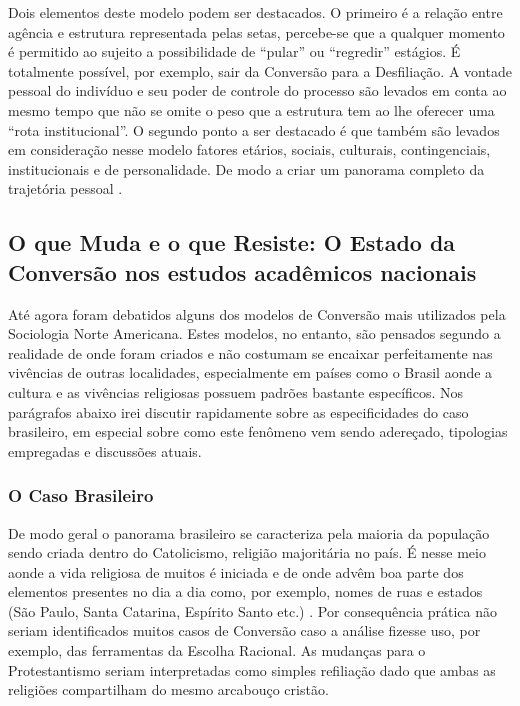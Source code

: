 \documentclass[
	12pt,				%
	oneside,			%
	a4paper,			%
	sumario=tradicional,
	english,			%
	brazil				%
	]{abntex2}
\begin{document}
Dois elementos deste modelo podem ser destacados. O primeiro é a relação entre agência e estrutura representada pelas setas, percebe-se que a qualquer momento é permitido ao sujeito a possibilidade de ``pular'' ou ``regredir'' estágios. É totalmente possível, por exemplo, sair da Conversão para a Desfiliação. A vontade pessoal do indivíduo e seu poder de controle do processo são levados em conta ao mesmo tempo que não se omite o peso que a estrutura tem ao lhe oferecer uma ``rota institucional''. O segundo ponto a ser destacado é que também são levados em consideração nesse modelo fatores etários, sociais, culturais, contingenciais, institucionais e de personalidade. De modo a criar um panorama completo da trajetória pessoal \autocite[351]{gooren_reassessing_2007-1}.

\hypertarget{o-que-muda-e-o-que-resiste-o-estado-da-conversuxe3o-nos-estudos-acaduxeamicos-nacionais}{%
\subsection{O que Muda e o que Resiste: O Estado da Conversão nos estudos acadêmicos nacionais}\label{o-que-muda-e-o-que-resiste-o-estado-da-conversuxe3o-nos-estudos-acaduxeamicos-nacionais}}

Até agora foram debatidos alguns dos modelos de Conversão mais utilizados pela Sociologia Norte Americana. Estes modelos, no entanto, são pensados segundo a realidade de onde foram criados e não costumam se encaixar perfeitamente nas vivências de outras localidades, especialmente em países como o Brasil aonde a cultura e as vivências religiosas possuem padrões bastante específicos. Nos parágrafos abaixo irei discutir rapidamente sobre as especificidades do caso brasileiro, em especial sobre como este fenômeno vem sendo adereçado, tipologias empregadas e discussões atuais.

\hypertarget{o-caso-brasileiro}{%
\subsubsection{O Caso Brasileiro}\label{o-caso-brasileiro}}

De modo geral o panorama brasileiro se caracteriza pela maioria da população sendo criada dentro do Catolicismo, religião majoritária no país. É nesse meio aonde a vida religiosa de muitos é iniciada e de onde advêm boa parte dos elementos presentes no dia a dia como, por exemplo, nomes de ruas e estados (São Paulo, Santa Catarina, Espírito Santo etc.) \autocite{prandi_converting_2008}. Por consequência prática não seriam identificados muitos casos de Conversão caso a análise fizesse uso, por exemplo, das ferramentas da Escolha Racional. As mudanças para o Protestantismo seriam interpretadas como simples refiliação dado que ambas as religiões compartilham do mesmo arcabouço cristão.
\end{document}
